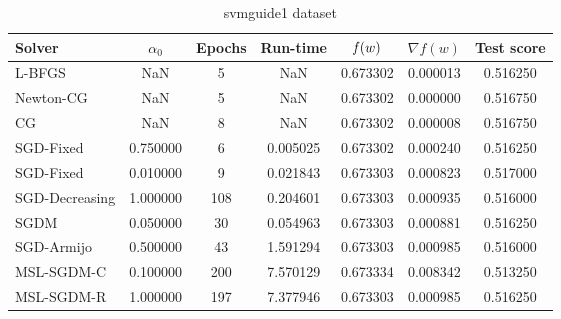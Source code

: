 \begin{table}
\caption{svmguide1 dataset}
\label{tab:svm-tab}
\centering
\begin{tabular}{lS[round-precision=3]S[drop-zero-decimal]S[round-precision=4]S[round-precision=6]S[exponent-mode=scientific]S[round-precision=6]}
\toprule
Solver & {$\alpha_0$} & {Epochs} & {Run-time} & {$\operatorname*{\mathit{f}}(w)$} & {$\nabla f(w)$} & {Test score} \\
\midrule
L-BFGS & NaN & 5 & NaN & 0.673302 & 0.000013 & 0.516250 \\
Newton-CG & NaN & 5 & NaN & 0.673302 & 0.000000 & 0.516750 \\
CG & NaN & 8 & NaN & 0.673302 & 0.000008 & 0.516750 \\
SGD-Fixed & 0.750000 & 6 & 0.005025 & 0.673302 & 0.000240 & 0.516250 \\
SGD-Fixed & 0.010000 & 9 & 0.021843 & 0.673303 & 0.000823 & 0.517000 \\
SGD-Decreasing & 1.000000 & 108 & 0.204601 & 0.673303 & 0.000935 & 0.516000 \\
SGDM & 0.050000 & 30 & 0.054963 & 0.673303 & 0.000881 & 0.516250 \\
SGD-Armijo & 0.500000 & 43 & 1.591294 & 0.673303 & 0.000985 & 0.516000 \\
MSL-SGDM-C & 0.100000 & 200 & 7.570129 & 0.673334 & 0.008342 & 0.513250 \\
MSL-SGDM-R & 1.000000 & 197 & 7.377946 & 0.673303 & 0.000985 & 0.516250 \\
\bottomrule
\end{tabular}
\end{table}


